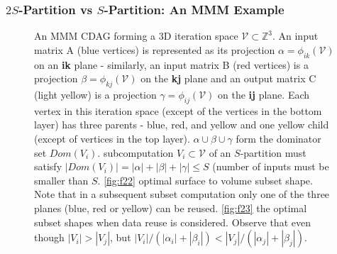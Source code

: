 \documentclass[sigplan,review,anonymous]{acmart}\settopmatter{printfolios=true,printccs=false,printacmref=false}
\begin{document}
\subsubsection{$2S$-Partition vs $S$-Partition: An MMM Example}

\label{sec:mmmExample}

\begin{figure}
	\centering
	\hfill
	\hfill
	\caption{\label{fig:f21} An MMM CDAG forming a 3D 
		iteration 
		space $\mathcal{V} \subset \mathbb{Z}^3$. An input matrix A (blue 
		vertices) 
		is represented as 
		its projection $\alpha = \phi_{ik}(\mathcal{V})$
		on 
		an \textbf{ik} plane - similarly, an input matrix B (red vertices) is a 
		projection $\beta = \phi_{kj}(\mathcal{V})$ on the \textbf{kj} plane 
		and an 
		output 
		matrix C (light yellow) 
		is a 
		projection $\gamma = \phi_{ij}(\mathcal{V})$ on the \textbf{ij} plane. 
		Each 
		vertex 
		in this iteration space 
		(except of the vertices in the bottom layer) has three parents - blue, 
		red, 
		and yellow and one yellow child (except of vertices in the top layer). 
		$\alpha \cup \beta \cup \gamma$ form the dominator set $Dom(V_i)$.  
		subcomputation $V_i \subset \mathcal{V}$ of an $S$-partition must 
		satisfy 
		$|Dom(V_i)| = |\alpha| + |\beta| + |\gamma| \le S$ (number of inputs 
		must 
		be 
		smaller than $S$. \ref{fig:f22} 
		optimal surface to volume subset shape. Note that in a subsequent 
		subset computation only one of the three planes (blue, red or yellow) 
		can 
		be reused. \ref{fig:f23} the optimal subset shapes when 
		data reuse is considered. Observe that even though $|V_i| > |V_j|$, but 
		$|V_i|/(|\alpha_i| + |\beta_i|) < |V_j|/(|\alpha_j| + |\beta_j|)$.}
	\label{fig:iterationSpace}
\end{figure}
\end{document}
